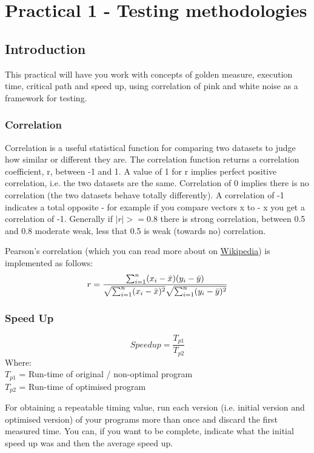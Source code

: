 \newpage
\section{Practical 1 - Testing methodologies}
\label{sec:Prac1}

\subsection{Introduction}
This practical will have you work with concepts of golden measure, execution time, critical path and speed up, using correlation of pink and white noise as a framework for testing.

\subsubsection{Correlation}
Correlation is a useful statistical function for comparing two datasets to judge how similar or different they are. The correlation function returns a correlation coefficient, r, between -1 and 1. A value of 1 for r implies perfect positive correlation, i.e. the two datasets are the same. Correlation of 0 implies there is no correlation (the two datasets behave totally differently). A correlation of -1 indicates a total opposite - for example if you compare vectors x to - x you get a correlation of -1. Generally if $|r| >= 0.8$ there is strong correlation, between 0.5 and 0.8 moderate weak, less that 0.5 is weak (towards no) correlation.

Pearson's correlation (which you can read more about on \href{https://en.wikipedia.org/wiki/Pearson_correlation_coefficient}{Wikipedia}) is implemented as follows:
\begin{equation}
\label{eqn:Pearson}
  r =
  \frac{ \sum_{i=1}^{n}(x_i-\bar{x})(y_i-\bar{y}) }{%
        \sqrt{\sum_{i=1}^{n}(x_i-\bar{x})^2}\sqrt{\sum_{i=1}^{n}(y_i-\bar{y})^2}}
\end{equation}

\subsubsection{Speed Up}
\begin{equation}
Speedup = \frac{T_{p1}}{T_{p2}}
\end{equation}
Where:\\
$T_{p1}$ = Run-time of original / non-optimal program\\
$T_{p2}$ = Run-time of optimised program

For obtaining a repeatable timing value, run each version (i.e. initial version and optimised version) of your programs more than once and discard the first measured time. You can, if you want to be complete, indicate what the initial speed up was and then the average speed up.

